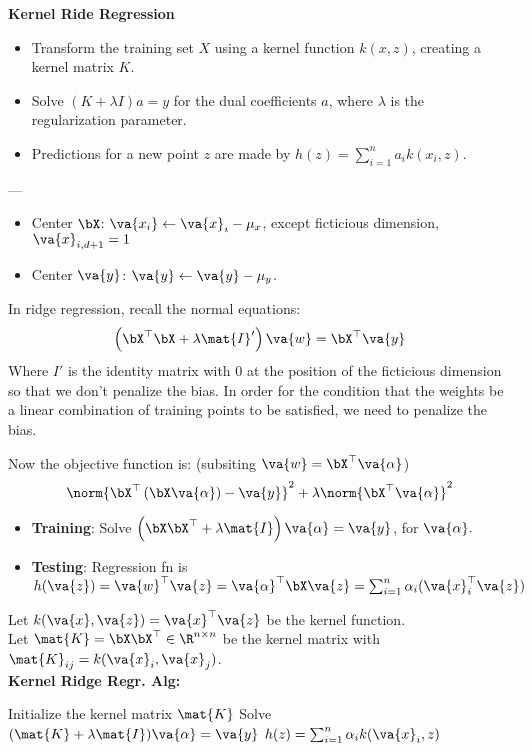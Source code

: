 \documentclass[10pt,landscape]{article}
\begin{document}
\begin{multicols*}{3}
    \textbf{Kernel Ride Regression}
    \begin{itemize}
        \item Transform the training set $X$ using a kernel function $k(x, z)$, creating a kernel matrix $K$.
        \item Solve $(K + \lambda I)a = y$ for the dual coefficients $a$, where $\lambda$ is the regularization parameter.
        \item Predictions for a new point $z$ are made by $h(z) = \sum_{i=1}^{n} a_i k(x_i, z)$.
    \end{itemize}
    ---
    \begin{itemize}
        \item Center $\bX$: $\va{x_i} \leftarrow \va{x}_i - \mu_x$, except ficticious dimension, $\va{x}_{i, d + 1} = 1$
        \item Center $\va{y}$: $\va{y} \leftarrow \va{y} - \mu_y$.
    \end{itemize}
    In ridge regression, recall the normal equations:
    \[
        \left(\bX^\top \bX + \lambda \mat{I}'\right) \va{w} = \bX^\top \va{y}
    \]
    Where $I'$ is the identity matrix with 0 at the position of the ficticious dimension so that we don't penalize the bias. In order for the condition that the weights be a linear combination of training points to be satisfied, we need to penalize the bias.

    Now the objective function is: (subsiting $\va{w} = \bX^\top \va{\alpha}$)
    \[
        \norm{\bX^\top \left(\bX \va{\alpha}\right) - \va{y}}^2 + \lambda \norm{\bX^\top \va{\alpha}}^2
    \]
    \begin{itemize}
        \item \textbf{Training}: Solve $\left(\bX\bX^\top + \lambda \mat{I}\right) \va{\alpha} = \va{y}$, for $\va{\alpha}.$
        \item \textbf{Testing}: Regression fn is $h(\va{z}) = \va{w}^\top \va{z} = \va{\alpha}^\top \bX \va{z} = \sum_{i = 1}^{n} \alpha_i (\va{x}_i^\top \va{z})$
    \end{itemize}
    Let $k(\va{x}, \va{z}) = \va{x}^\top \va{z}$ be the kernel function. \\
    Let $\mat{K} = \bX \bX^\top \in \R^{n \times n}$ be the kernel matrix with $\mat{K}_{ij} = k(\va{x}_i, \va{x}_j)$. \\
    \textbf{Kernel Ridge Regr. Alg:}
    \begin{algorithmic}
        \State Initialize the kernel matrix $\mat{K}$ 
        \State Solve $(\mat{K} + \lambda \mat{I}) \va{\alpha} = \va{y}$ 
        \State $h(z) = \sum_{i = 1}^{n} \alpha_i k(\va{x}_i, z)$ 
        \EndFor
    \end{algorithmic}

\end{multicols*}
\end{document}
